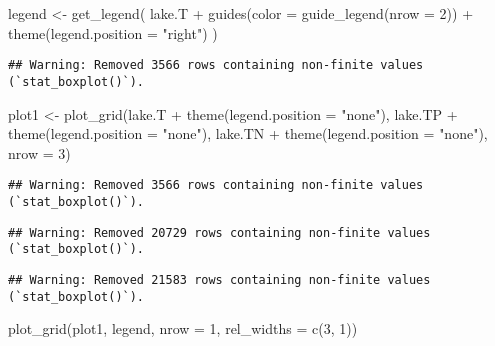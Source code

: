 \documentclass[
]{article}
\newenvironment{Shaded}{\begin{snugshade}}{\end{snugshade}}
\newcommand{\AttributeTok}[1]{\textcolor[rgb]{0.77,0.63,0.00}{#1}}
\newcommand{\DecValTok}[1]{\textcolor[rgb]{0.00,0.00,0.81}{#1}}
\newcommand{\FunctionTok}[1]{\textcolor[rgb]{0.00,0.00,0.00}{#1}}
\newcommand{\NormalTok}[1]{#1}
\newcommand{\OtherTok}[1]{\textcolor[rgb]{0.56,0.35,0.01}{#1}}
\newcommand{\SpecialCharTok}[1]{\textcolor[rgb]{0.00,0.00,0.00}{#1}}
\newcommand{\StringTok}[1]{\textcolor[rgb]{0.31,0.60,0.02}{#1}}
\begin{document}
\begin{Shaded}
\begin{Highlighting}[]
\NormalTok{legend }\OtherTok{\textless{}{-}} \FunctionTok{get\_legend}\NormalTok{(}
\NormalTok{  lake.T }\SpecialCharTok{+} 
  \FunctionTok{guides}\NormalTok{(}\AttributeTok{color =} \FunctionTok{guide\_legend}\NormalTok{(}\AttributeTok{nrow =} \DecValTok{2}\NormalTok{)) }\SpecialCharTok{+} 
  \FunctionTok{theme}\NormalTok{(}\AttributeTok{legend.position =} \StringTok{"right"}\NormalTok{)}
\NormalTok{)}
\end{Highlighting}
\end{Shaded}

\begin{verbatim}
## Warning: Removed 3566 rows containing non-finite values (`stat_boxplot()`).
\end{verbatim}

\begin{Shaded}
\begin{Highlighting}[]
\NormalTok{plot1 }\OtherTok{\textless{}{-}} \FunctionTok{plot\_grid}\NormalTok{(lake.T }\SpecialCharTok{+} \FunctionTok{theme}\NormalTok{(}\AttributeTok{legend.position =} \StringTok{"none"}\NormalTok{), }
\NormalTok{          lake.TP }\SpecialCharTok{+} \FunctionTok{theme}\NormalTok{(}\AttributeTok{legend.position =} \StringTok{"none"}\NormalTok{), }
\NormalTok{          lake.TN }\SpecialCharTok{+} \FunctionTok{theme}\NormalTok{(}\AttributeTok{legend.position =} \StringTok{"none"}\NormalTok{), }
          \AttributeTok{nrow =} \DecValTok{3}\NormalTok{)}
\end{Highlighting}
\end{Shaded}

\begin{verbatim}
## Warning: Removed 3566 rows containing non-finite values (`stat_boxplot()`).
\end{verbatim}

\begin{verbatim}
## Warning: Removed 20729 rows containing non-finite values (`stat_boxplot()`).
\end{verbatim}

\begin{verbatim}
## Warning: Removed 21583 rows containing non-finite values (`stat_boxplot()`).
\end{verbatim}

\begin{Shaded}
\begin{Highlighting}[]
\FunctionTok{plot\_grid}\NormalTok{(plot1, legend, }\AttributeTok{nrow =} \DecValTok{1}\NormalTok{, }\AttributeTok{rel\_widths =} \FunctionTok{c}\NormalTok{(}\DecValTok{3}\NormalTok{, }\DecValTok{1}\NormalTok{))}
\end{Highlighting}
\end{Shaded}
\end{document}
